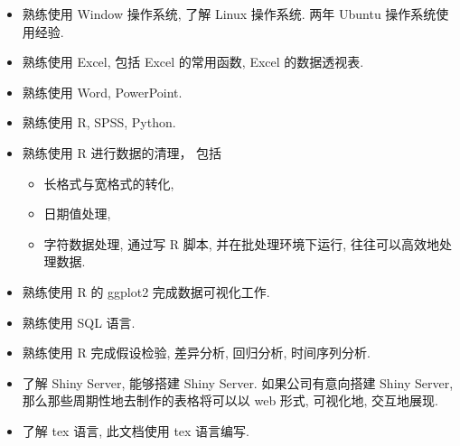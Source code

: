 \begin{itemize}
\item 熟练使用 Window 操作系统, 了解 Linux 操作系统. 两年 Ubuntu 操作系统使用经验.
\item 熟练使用 Excel, 包括 Excel 的常用函数, Excel 的数据透视表.
\item 熟练使用 Word, PowerPoint.
\item 熟练使用 R, SPSS, Python.
\item 熟练使用 R 进行数据的清理， 包括
\begin{itemize}
\item 长格式与宽格式的转化,
\item 日期值处理,
\item 字符数据处理,
\newline\noindent 通过写 R 脚本, 并在批处理环境下运行, 往往可以高效地处理数据.
\end{itemize}
\item 熟练使用 R 的 ggplot2 完成数据可视化工作.
\item 熟练使用 SQL 语言.
\item 熟练使用 R 完成假设检验, 差异分析, 回归分析, 时间序列分析.
\item 了解 Shiny Server, 能够搭建 Shiny Server. 如果公司有意向搭建 Shiny Server, 那么那些周期性地去制作的表格将可以以 web 形式, 可视化地, 交互地展现.
\item 了解 tex 语言, 此文档使用 tex 语言编写.
\end{itemize}
